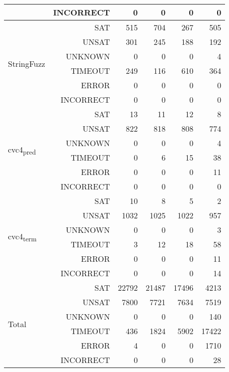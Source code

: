 \begin{table}[h]
{{\begin{tabular}{|l r | r r r r |}
							& INCORRECT&     0&     0&     0&     0 \\ \hline
\multirow{6}{*}{StringFuzz}	& SAT      &   515&   704&   267&   505 \\
							& UNSAT    &   301&   245&   188&   192 \\
							& UNKNOWN  &     0&     0&     0&     4 \\
							& TIMEOUT  &   249&   116&   610&   364 \\
							& ERROR    &     0&     0&     0&     0 \\
							& INCORRECT&     0&     0&     0&     0 \\\hline
\multirow{6}{*}{cvc4\textsubscript{pred}} & SAT &    13&    11&    12&     8 \\
							& UNSAT    &   822&   818&   808&   774 \\
							& UNKNOWN  &     0&     0&     0&     4 \\
							& TIMEOUT  &     0&     6&    15&    38 \\
							& ERROR    &     0&     0&     0&     11 \\
							& INCORRECT&     0&     0&     0&     0 \\ \hline
\multirow{6}{*}{cvc4\textsubscript{term}} & SAT &    10&     8&     5&    2 \\
							& UNSAT    &  1032&  1025&  1022&   957 \\
							& UNKNOWN  &     0&     0&     0&     3 \\
							& TIMEOUT  &     3&    12&    18&    58 \\
							& ERROR    &     0&     0&     0&     11 \\
							& INCORRECT&     0&     0&     0&    14 \\ \hline \hline
\multirow{6}{*}{Total} 		& SAT      & 22792& 21487& 17496&  4213\\
							& UNSAT    &  7800&  7721&  7634&  7519\\
							& UNKNOWN  &     0&     0&     0&   140\\
							& TIMEOUT  &  436&  1824&  5902& 17422 \\
							& ERROR    &     4&     0&     0&  1710\\
							& INCORRECT&     0&     0&     0&    28 \\\hline
\end{tabular}}
\label{table:base_benchmark}}
\end{table}

